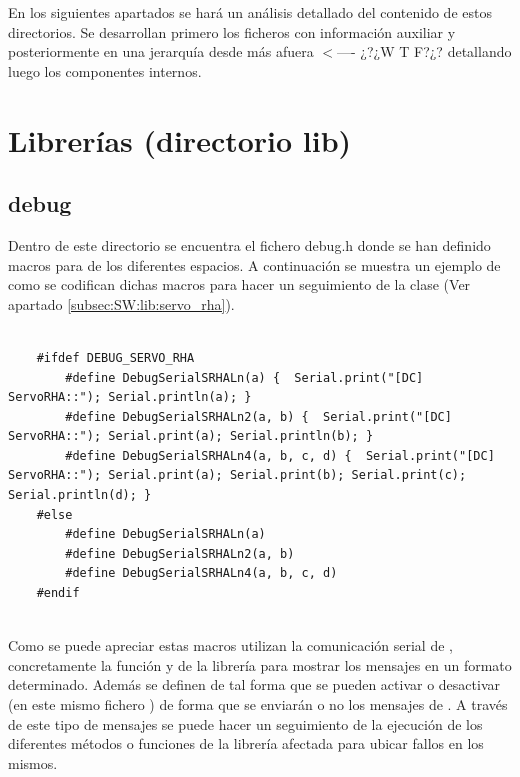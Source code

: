     En los siguientes apartados se hará un análisis detallado del contenido de estos directorios. Se desarrollan primero los ficheros con información auxiliar y posteriormente en una jerarquía desde más afuera \textcolor{pRojo}{$<$---- ¿?¿W T F?¿?} detallando luego los componentes internos.
\section{Librerías (directorio lib)} \label{sec:SW:lib}

    \subsection{debug} \label{subsec:SW:lib:debug}
        Dentro de este directorio se encuentra el fichero debug.h donde se han definido macros para  de los diferentes espacios. A continuación se muestra un ejemplo de como se codifican dichas macros para hacer un seguimiento de la clase  (Ver apartado \ref{subsec:SW:lib:servo_rha}).
        
        \lstset{language=C, breaklines=true, basicstyle=\footnotesize}
        \begin{lstlisting}[frame=single]
        
    #ifdef DEBUG_SERVO_RHA
        #define DebugSerialSRHALn(a) {  Serial.print("[DC]  ServoRHA::"); Serial.println(a); }
        #define DebugSerialSRHALn2(a, b) {  Serial.print("[DC]  ServoRHA::"); Serial.print(a); Serial.println(b); }
        #define DebugSerialSRHALn4(a, b, c, d) {  Serial.print("[DC]  ServoRHA::"); Serial.print(a); Serial.print(b); Serial.print(c); Serial.println(d); }
    #else
        #define DebugSerialSRHALn(a)
        #define DebugSerialSRHALn2(a, b)
        #define DebugSerialSRHALn4(a, b, c, d)
    #endif
            
        \end{lstlisting}

        Como se puede apreciar estas macros utilizan la comunicación serial de , concretamente la función  y  de la librería  para mostrar los mensajes en un formato determinado. Además se definen de tal forma que se pueden activar o desactivar (en este mismo fichero ) de forma que se enviarán o no los mensajes de . A través de este tipo de mensajes se puede hacer un seguimiento de la ejecución de los diferentes métodos o funciones de la librería afectada para ubicar fallos en los mismos.


